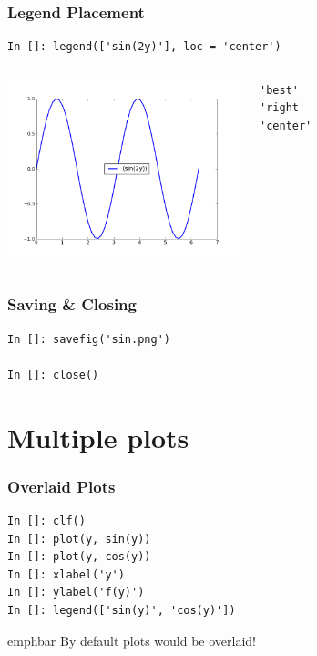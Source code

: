 \documentclass[14pt,compress]{beamer}
\newcommand{\emphbar}[1]
{\begin{beamercolorbox}[rounded=true]{emphbar} 
      {#1}
 \end{beamercolorbox}
}
\newcounter{time}
\newcommand{\inctime}[1]{\addtocounter{time}{#1}{\tiny \thetime\ m}}
\begin{document}
\begin{frame}[fragile]
\frametitle{Legend Placement}
\begin{block}{}
    \small
\begin{lstlisting}
In []: legend(['sin(2y)'], loc = 'center')
\end{lstlisting}
\end{block}

\begin{columns}
 \includegraphics[height=2in, interpolate=true]{data/position}  
\vspace{-0.2in}
\begin{lstlisting}
'best' 
'right'
'center'
\end{lstlisting}
\end{columns}
\end{frame}


\begin{frame}[fragile]
\frametitle{Saving \& Closing}
\begin{lstlisting}
In []: savefig('sin.png')

In []: close()
\end{lstlisting}
\end{frame}

\section{Multiple plots}
\begin{frame}[fragile]
\frametitle{Overlaid Plots}
\begin{lstlisting}
In []: clf()
In []: plot(y, sin(y))
In []: plot(y, cos(y))
In []: xlabel('y')
In []: ylabel('f(y)')
In []: legend(['sin(y)', 'cos(y)']) 
\end{lstlisting}
\emphbar{By default plots would be overlaid!}
\end{frame}
\end{document}
